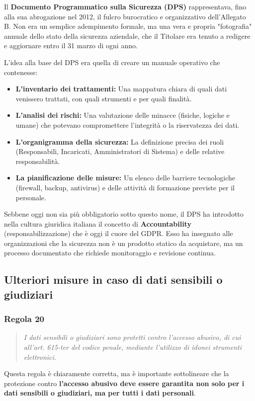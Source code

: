 Il \textbf{Documento Programmatico sulla Sicurezza (DPS)} rappresentava, fino alla sua abrogazione nel 2012, il fulcro burocratico e organizzativo dell'Allegato B. Non era un semplice adempimento formale, ma una vera e propria "fotografia" annuale dello stato della sicurezza aziendale, che il Titolare era tenuto a redigere e aggiornare entro il 31 marzo di ogni anno.

L'idea alla base del DPS era quella di creare un manuale operativo che contenesse:
\begin{itemize}
    \item \textbf{L'inventario dei trattamenti:} Una mappatura chiara di quali dati venissero trattati, con quali strumenti e per quali finalità.
    \item \textbf{L'analisi dei rischi:} Una valutazione delle minacce (fisiche, logiche e umane) che potevano compromettere l'integrità o la riservatezza dei dati.
    \item \textbf{L'organigramma della sicurezza:} La definizione precisa dei ruoli (Responsabili, Incaricati, Amministratori di Sistema) e delle relative responsabilità.
    \item \textbf{La pianificazione delle misure:} Un elenco delle barriere tecnologiche (firewall, backup, antivirus) e delle attività di formazione previste per il personale.
\end{itemize}

Sebbene oggi non sia più obbligatorio sotto questo nome, il DPS ha introdotto nella cultura giuridica italiana il concetto di \textbf{Accountability} (responsabilizzazione) che è oggi il cuore del GDPR. Esso ha insegnato alle organizzazioni che la sicurezza non è un prodotto statico da acquistare, ma un processo documentato che richiede monitoraggio e revisione continua.

\subsection{Ulteriori misure in caso di dati sensibili o giudiziari}
\subsubsection*{Regola 20}
\begin{quote}
    \textit{I dati sensibili o giudiziari sono protetti contro l'accesso abusivo, di cui all'art. 615-ter del codice penale, mediante l'utilizzo di idonei strumenti elettronici.}
\end{quote}
Questa regola è chiaramente corretta, ma è importante sottolineare che la protezione contro \textbf{l'accesso abusivo deve essere garantita non solo per i dati sensibili o giudiziari, ma per tutti i dati personali}.

